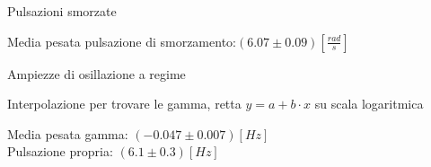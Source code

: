 %	

\begin{tabella}
	\centering
	
	\caption{Pulsazioni smorzate}
	\label{tab:pulssmorz}
\end{tabella}
Media pesata pulsazione di smorzamento:$ (6.07 \pm 0.09) [\frac{rad}{s}]$ \\

\begin{tabella}
	\centering
	
	\caption{Ampiezze di osillazione a regime}
	\label{tab:regime}
\end{tabella}

\begin{tabella}
	\centering
	
	\caption{Interpolazione per trovare le gamma, retta $y=a+b \cdot x$ su scala logaritmica}
	\label{tab:gamma}
\end{tabella}
\noindent 
Media pesata gamma: $(-0.047 \pm 0.007) [Hz] $\\
Pulsazione propria: $(6.1 \pm 0.3) [Hz]$\\
